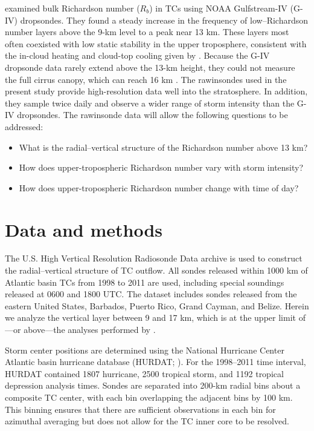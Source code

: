 \cite{Molinarietal2014} examined bulk Richardson number ($R_b$) in TCs using NOAA Gulfstream-IV (G-IV) dropsondes.
They found a steady increase in the frequency of low--Richardson number layers above the 9-km level to a peak near 13 km.
These layers most often coexisted with low static stability in the upper troposphere, consistent with the in-cloud heating and cloud-top cooling given by \cite{Buetal2014}.
Because the G-IV dropsonde data rarely extend above the 13-km height, they could not measure the full cirrus canopy, which can reach 16 km \cite{Waco1970}.
The rawinsondes used in the present study provide high-resolution data well into the stratosphere.
In addition, they sample twice daily and observe a wider range of storm intensity than the G-IV dropsondes.
The rawinsonde data will allow the following questions to be addressed:
\begin{itemize}
   \item What is the radial–vertical structure of the Richardson number above 13 km?
   \item How does upper-tropospheric Richardson number vary with storm intensity?
   \item How does upper-tropospheric Richardson number change with time of day?
\end{itemize}

\section{Data and methods}
The U.S. High Vertical Resolution Radiosonde Data archive \citep{LoveGeller2012} is used to construct the radial–vertical structure of TC outflow.
All sondes released within 1000 km of Atlantic basin TCs from 1998 to 2011 are used, including special soundings released at 0600 and 1800 UTC.
The dataset includes sondes released from the eastern United States, Barbados, Puerto Rico, Grand Cayman, and Belize.
Herein we analyze the vertical layer between 9 and 17 km, which is at the upper limit of---or above---the analyses performed by \cite{Molinarietal2014}.

Storm center positions are determined using the National Hurricane Center Atlantic basin hurricane database (HURDAT; \citeauthor{Jarvinenetal1984} \citeyear{Jarvinenetal1984}).
For the 1998–2011 time interval, HURDAT contained 1807 hurricane, 2500 tropical storm, and 1192 tropical depression analysis times.
Sondes are separated into 200-km radial bins about a composite TC center, with each bin overlapping the adjacent bins by 100 km.
This binning ensures that there are sufficient observations in each bin for azimuthal averaging but does not allow for the TC inner core to be resolved.

